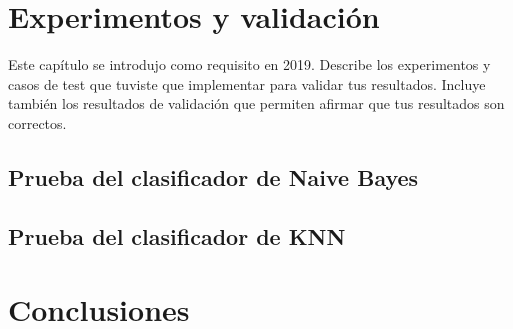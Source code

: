 \documentclass[a4paper, 12pt]{book}
\begin{document}

\cleardoublepage
\chapter{Experimentos y validación}

Este capítulo se introdujo como requisito en 2019. 
Describe los experimentos y casos de test que tuviste que implementar para validar tus resultados. 
Incluye también los resultados de validación que permiten afirmar que tus resultados son correctos. 

\section{Prueba del clasificador de Naive Bayes} 
\label{sec:pruebabayes}

\section{Prueba del clasificador de KNN} 
\label{sec:pruebaknn}







\cleardoublepage
\chapter{Conclusiones}
\label{chap:conclusiones}
\end{document}
